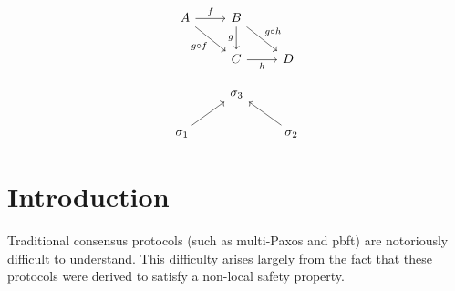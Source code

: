\documentclass{article}
\theoremstyle{definition}
\begin{document}
\begin{equation}
\begin{tikzcd}
A \arrow[r,"f"]
  \arrow[dr,swap,"g\circ f"]
  &
B \arrow[dr,"g\circ h"]
  \arrow[d,swap,"g"]
  \\
  {}&
C \arrow[r,swap,"h"]
  &
D
\end{tikzcd}
\end{equation}


\begin{equation*}
\begin{tikzcd}
{}
  &
\sigma_3
  &
{}
  \\ 
\sigma_1
  \arrow[ur,""]
  &
{}
  &
\sigma_2
  \arrow[ul,""]
\end{tikzcd}
\end{equation*}



\fi









































































\iffalse



\section{Introduction}
Traditional consensus protocols (such as multi-Paxos and pbft) are notoriously difficult to understand. This difficulty arises largely from the fact that these protocols were derived to satisfy a non-local safety property.
\end{document}
